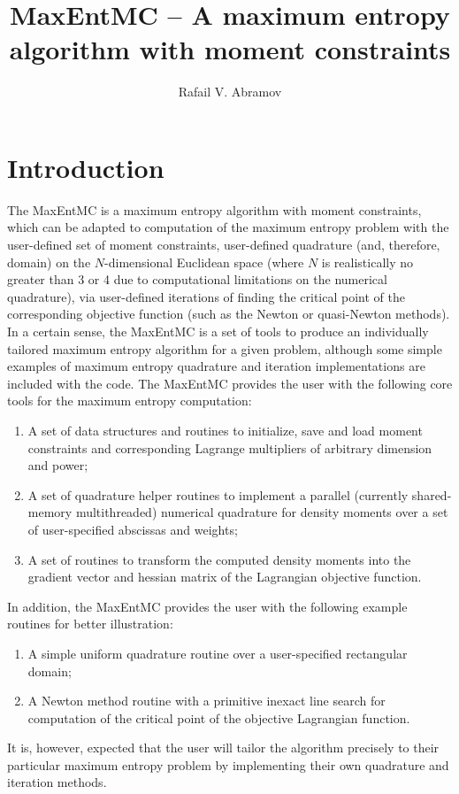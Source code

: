 \documentclass[12pt]{amsart}
\numberwithin{equation}{section}
\begin{document}
\title{MaxEntMC -- A maximum entropy algorithm with moment
constraints}

\author{Rafail V. Abramov}

\maketitle

\tableofcontents

\section{Introduction}

The MaxEntMC is a maximum entropy algorithm with moment constraints,
which can be adapted to computation of the maximum entropy problem
with the user-defined set of moment constraints, user-defined
quadrature (and, therefore, domain) on the $N$-dimensional Euclidean
space (where $N$ is realistically no greater than 3 or 4 due to
computational limitations on the numerical quadrature), via
user-defined iterations of finding the critical point of the
corresponding objective function (such as the Newton or quasi-Newton
methods). In a certain sense, the MaxEntMC is a set of tools to
produce an individually tailored maximum entropy algorithm for a given
problem, although some simple examples of maximum entropy quadrature
and iteration implementations are included with the code. The MaxEntMC
provides the user with the following core tools for the maximum
entropy computation:
%
\begin{enumerate}
\item A set of data structures and routines to initialize, save and
  load moment constraints and corresponding Lagrange multipliers of
  arbitrary dimension and power;
\item A set of quadrature helper routines to implement a parallel
  (currently shared-memory multithreaded) numerical quadrature for
  density moments over a set of user-specified abscissas and weights;
\item A set of routines to transform the computed density moments into
  the gradient vector and hessian matrix of the Lagrangian objective
  function.
\end{enumerate}
%
In addition, the MaxEntMC provides the user with the following 
example routines for better illustration:
%
\begin{enumerate}
\item A simple uniform quadrature routine over a user-specified
  rectangular domain;
\item A Newton method routine with a primitive inexact line search for
  computation of the critical point of the objective Lagrangian
  function.
\end{enumerate}
%
It is, however, expected that the user will tailor the algorithm
precisely to their particular maximum entropy problem by implementing
their own quadrature and iteration methods.
\end{document}

